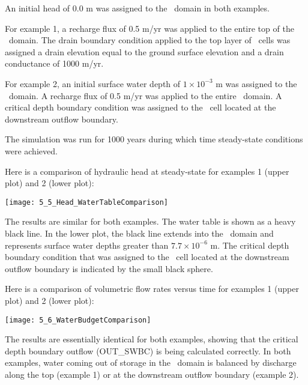 An initial head of 0.0 m was assigned to the \gwf\ domain in both examples.

For example 1, a recharge flux of 0.5 m/yr was applied to the entire top of the \gwf\ domain.  The drain boundary condition applied to the top layer of \gwf\ cells was assigned a drain elevation equal to the ground surface elevation and a drain conductance of 1000 m/yr.

For example 2, an initial surface water depth of $1 \times 10^{-3}$ m was assigned to the \swf\ domain.  A recharge flux of 0.5 m/yr was applied to the entire \swf\ domain. A critical depth boundary condition was assigned to the \swf\ cell located at the downstream outflow boundary.

The simulation was run for 1000 years during which time steady-state conditions were achieved.

\pagebreak
Here is a comparison of hydraulic head  at steady-state for examples 1 (upper plot) and 2 (lower plot):

\texttt{[image: 5\_5\_Head\_WaterTableComparison]}

The results are similar for both examples. The water table is shown as a heavy black line.  In the lower plot, the black line extends into the \swf\ domain and represents surface water depths greater than $7.7 \times 10^{-6}$ m.  The critical depth boundary condition that was assigned to the \swf\ cell located at the downstream outflow boundary is indicated by the small black sphere.

\pagebreak
Here is a comparison of volumetric flow rates versus time  for examples 1 (upper plot) and 2 (lower plot):

\texttt{[image: 5\_6\_WaterBudgetComparison]}

The results are essentially identical for both examples, showing that the critical depth boundary outflow ({\sf OUT\_SWBC}) is being calculated correctly. In both examples, water coming out of storage in the \gwf\ domain is balanced by discharge along the top (example 1)  or at the downstream outflow boundary (example 2).

